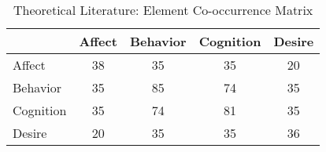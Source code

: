 \begin{table}
\begin{minipage}[t][\textheight][t]{\textwidth}

\caption{\label{tab:}Theoretical Literature: Element Co-occurrence Matrix}
\begin{tabular}[t]{lcccc}
\toprule
  & Affect & Behavior & Cognition & Desire\\
\midrule
Affect & 38 & 35 & 35 & 20\\
Behavior & 35 & 85 & 74 & 35\\
Cognition & 35 & 74 & 81 & 35\\
Desire & 20 & 35 & 35 & 36\\
\bottomrule
\end{tabular}
\end{minipage}
\end{table}
